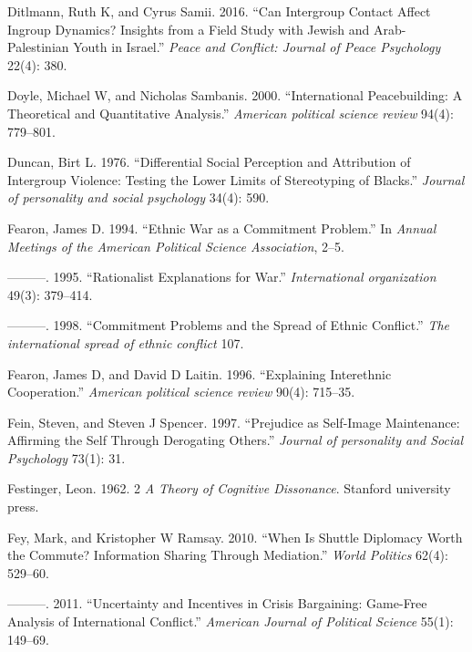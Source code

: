 \documentclass[11pt]{article}
\begin{document}
\leavevmode\hypertarget{ref-ditlmann2016can}{}%
Ditlmann, Ruth K, and Cyrus Samii. 2016. ``Can Intergroup Contact Affect
Ingroup Dynamics? Insights from a Field Study with Jewish and
Arab-Palestinian Youth in Israel.'' \emph{Peace and Conflict: Journal of
Peace Psychology} 22(4): 380.

\leavevmode\hypertarget{ref-doyle2000international}{}%
Doyle, Michael W, and Nicholas Sambanis. 2000. ``International
Peacebuilding: A Theoretical and Quantitative Analysis.'' \emph{American
political science review} 94(4): 779--801.

\leavevmode\hypertarget{ref-duncan1976differential}{}%
Duncan, Birt L. 1976. ``Differential Social Perception and Attribution
of Intergroup Violence: Testing the Lower Limits of Stereotyping of
Blacks.'' \emph{Journal of personality and social psychology} 34(4):
590.

\leavevmode\hypertarget{ref-fearon1994ethnic}{}%
Fearon, James D. 1994. ``Ethnic War as a Commitment Problem.'' In
\emph{Annual Meetings of the American Political Science Association},
2--5.

\leavevmode\hypertarget{ref-fearon1995rationalist}{}%
---------. 1995. ``Rationalist Explanations for War.''
\emph{International organization} 49(3): 379--414.

\leavevmode\hypertarget{ref-fearon1998commitment}{}%
---------. 1998. ``Commitment Problems and the Spread of Ethnic
Conflict.'' \emph{The international spread of ethnic conflict} 107.

\leavevmode\hypertarget{ref-fearon1996explaining}{}%
Fearon, James D, and David D Laitin. 1996. ``Explaining Interethnic
Cooperation.'' \emph{American political science review} 90(4): 715--35.

\leavevmode\hypertarget{ref-fein1997prejudice}{}%
Fein, Steven, and Steven J Spencer. 1997. ``Prejudice as Self-Image
Maintenance: Affirming the Self Through Derogating Others.''
\emph{Journal of personality and Social Psychology} 73(1): 31.

\leavevmode\hypertarget{ref-festinger1962cognitiveDissonance}{}%
Festinger, Leon. 1962. 2 \emph{A Theory of Cognitive Dissonance}.
Stanford university press.

\leavevmode\hypertarget{ref-fey2010shuttle}{}%
Fey, Mark, and Kristopher W Ramsay. 2010. ``When Is Shuttle Diplomacy
Worth the Commute? Information Sharing Through Mediation.'' \emph{World
Politics} 62(4): 529--60.

\leavevmode\hypertarget{ref-fey2011uncertainty}{}%
---------. 2011. ``Uncertainty and Incentives in Crisis Bargaining:
Game-Free Analysis of International Conflict.'' \emph{American Journal
of Political Science} 55(1): 149--69.
\end{document}
